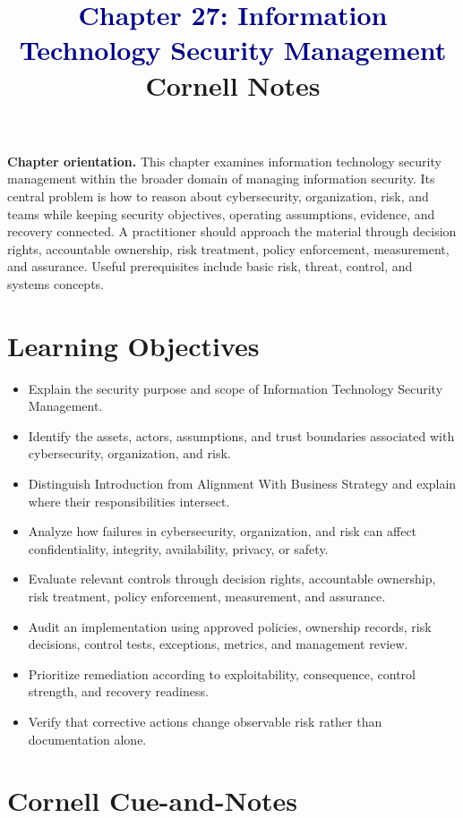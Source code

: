 \documentclass[11pt]{article}
\title{\textcolor{Navy}{Chapter 27: Information Technology Security Management}\\[2mm]\large Cornell Notes}
\author{}
\date{}
\begin{document}
\maketitle
\thispagestyle{fancy}
\vspace{-1.5em}
\begin{orientationbox}
\textbf{Chapter orientation.} This chapter examines information technology security management within the broader domain of managing information security. Its central problem is how to reason about cybersecurity, organization, risk, and teams while keeping security objectives, operating assumptions, evidence, and recovery connected. A practitioner should approach the material through decision rights, accountable ownership, risk treatment, policy enforcement, measurement, and assurance. Useful prerequisites include basic risk, threat, control, and systems concepts.
\end{orientationbox}
\section*{Learning Objectives}
\begin{itemize}
\item Explain the security purpose and scope of Information Technology Security Management.
\item Identify the assets, actors, assumptions, and trust boundaries associated with cybersecurity, organization, and risk.
\item Distinguish Introduction from Alignment With Business Strategy and explain where their responsibilities intersect.
\item Analyze how failures in cybersecurity, organization, and risk can affect confidentiality, integrity, availability, privacy, or safety.
\item Evaluate relevant controls through decision rights, accountable ownership, risk treatment, policy enforcement, measurement, and assurance.
\item Audit an implementation using approved policies, ownership records, risk decisions, control tests, exceptions, metrics, and management review.
\item Prioritize remediation according to exploitability, consequence, control strength, and recovery readiness.
\item Verify that corrective actions change observable risk rather than documentation alone.
\end{itemize}
\section*{Cornell Cue-and-Notes}
\end{document}
